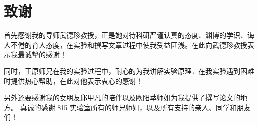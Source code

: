 \chapter*{致谢}
首先感谢我的导师武德珍教授，正是她对待科研严谨认真的态度、渊博的学识、诲人不倦的育人态度，在实验和撰写文章过程中使我受益匪浅。在此向武德珍教授表示我最诚挚的感谢！\par
同时，王原师兄在我的实验过程中，耐心的为我讲解实验原理，在我实验遇到困难时提供热心帮助，在此对他表示衷心的感谢！\par
另外还要感谢我的女朋友邱甲凡的陪伴以及欧阳萃师姐为我提供了撰写论文的地方。
真诚的感谢 815 实验室所有的师兄师姐，以及所有支持的亲人、同学和朋友们！
